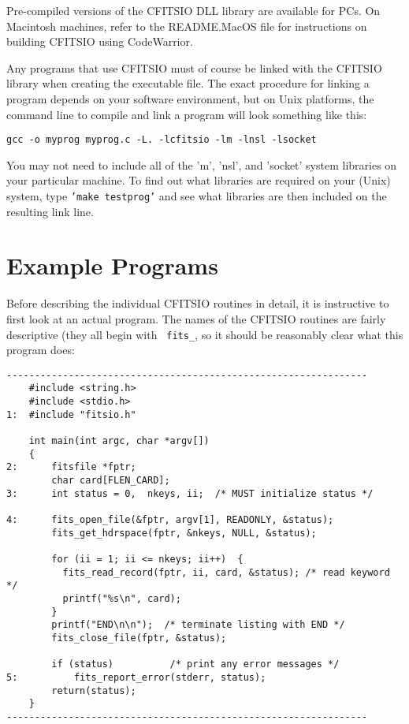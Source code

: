 \documentclass[11pt]{article}
\begin{document}
Pre-compiled versions of the CFITSIO DLL library are available for
PCs.  On Macintosh machines, refer to the README.MacOS file for
instructions on building CFITSIO using CodeWarrior.

Any programs that use CFITSIO must of course be linked with the CFITSIO
library when creating the executable file.  The exact procedure for
linking a program depends on your software environment, but on Unix
platforms, the command line to compile and link a program will look
something like this:

\begin{verbatim}
gcc -o myprog myprog.c -L. -lcfitsio -lm -lnsl -lsocket
\end{verbatim}

You may not need to include all of the 'm', 'nsl', and 'socket' system
libraries on your particular machine.  To find out what libraries are
required on your (Unix) system, type {\tt'make testprog'} and see what
libraries are then included on the resulting link line.

\newpage
\section{Example Programs}

Before describing the individual CFITSIO routines in detail, it is
instructive to first look at an actual program.  The names of the
CFITSIO routines are fairly descriptive (they all begin with {\tt
fits\_}, so it should be reasonably clear what this program does:

\begin{verbatim}
----------------------------------------------------------------
    #include <string.h>
    #include <stdio.h>
1:  #include "fitsio.h"

    int main(int argc, char *argv[])
    {
2:      fitsfile *fptr;         
        char card[FLEN_CARD]; 
3:      int status = 0,  nkeys, ii;  /* MUST initialize status */

4:      fits_open_file(&fptr, argv[1], READONLY, &status);
        fits_get_hdrspace(fptr, &nkeys, NULL, &status);

        for (ii = 1; ii <= nkeys; ii++)  { 
          fits_read_record(fptr, ii, card, &status); /* read keyword */
          printf("%s\n", card);
        }
        printf("END\n\n");  /* terminate listing with END */
        fits_close_file(fptr, &status);

        if (status)          /* print any error messages */
5:          fits_report_error(stderr, status);
        return(status);
    }
----------------------------------------------------------------
\end{verbatim}
\end{document}
